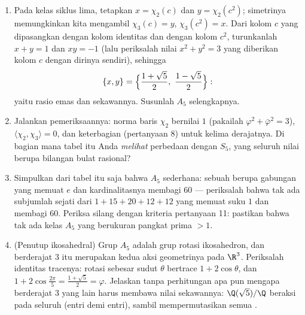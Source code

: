 \begin{problem}
\begin{enumerate}[resume]
        $3$. Ortogonalitas kolom (setiap kolom bukan identitas terhadap kolom
        identitasnya, dan setiap kolom dengan dirinya sendiri) menentukan
        nilainya di luar siklus lima:
        tunjukkan $\chi_2(g) = \chi_3(g) = -1$ pada transposisi
        ganda dan $0$ pada siklus tiga.
  \item Pada kelas siklus lima, tetapkan $x = \chi_2(c)$ dan $y =
        \chi_2(c^2)$; simetrinya memungkinkan kita mengambil $\chi_3(c) = y$,
        $\chi_3(c^2) = x$. Dari kolom $c$ yang dipasangkan dengan
        kolom identitas dan dengan kolom $c^2$, turunkanlah
        $x + y = 1$ dan $xy = -1$ (lalu periksalah nilai $x^2 +
        y^2 = 3$ yang diberikan kolom $c$ dengan dirinya sendiri), sehingga
        \[
        \{x, y\} = \Bigl\{\frac{1 + \sqrt5}2,\ \frac{1 -
        \sqrt5}2\Bigr\} :
        \]
        yaitu rasio emas dan sekawannya. Susunlah
         $A_5$ selengkapnya.
  \item Jalankan pemeriksaannya: norma baris $\chi_2$ bernilai $1$ (pakailah
        $\varphi^2 + \bar\varphi^2 = 3$), $\langle\chi_2,
        \chi_3\rangle = 0$, dan keterbagian  (pertanyaan
        8) untuk kelima derajatnya. Di bagian mana tabel itu Anda
        \emph{melihat} perbedaan dengan $S_5$, yang seluruh
        nilai  berupa bilangan bulat rasional?
  \item Simpulkan dari tabel itu saja bahwa $A_5$ sederhana: sebuah
         berupa gabungan 
        yang memuat $e$ dan kardinalitasnya membagi $60$ --- periksalah
        bahwa tak ada subjumlah sejati dari $1 + 15 + 20 + 12 + 12$
        yang memuat suku $1$ dan membagi $60$. Periksa silang dengan
        kriteria pertanyaan 11: pastikan bahwa tak ada kelas $A_5$
        yang berukuran pangkat prima $> 1$.
  \item (Penutup ikosahedral) Grup $A_5$ adalah grup rotasi
        ikosahedron, dan  berderajat $3$ itu merupakan
        kedua aksi geometrinya pada $\R^3$. Periksalah identitas
        tracenya: rotasi sebesar sudut $\theta$ bertrace $1 +
        2\cos\theta$, dan $1 + 2\cos\frac{2\pi}5 =
        \frac{1+\sqrt5}2 = \varphi$. Jelaskan tanpa
        perhitungan apa pun mengapa  berderajat $3$ yang lain harus
        membawa nilai sekawannya: 
        $\Q(\sqrt5)/\Q$ beraksi pada seluruh 
        (entri demi entri), sambil mempermutasikan semua  .
\end{enumerate}


\end{problem}
